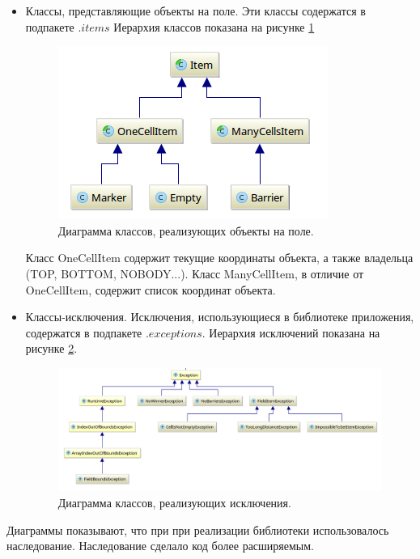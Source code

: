 \documentclass[a4paper]{article}
\begin{document}
\begin{itemize}
\item Классы, представляющие объекты на поле. Эти классы содержатся в подпакете $.items$ Иерархия классов показана на рисунке \ref{pic:classDiagram} 
\begin{figure}[H]
	\begin{center}
		\includegraphics[scale=0.5]{classDiagram}
		\caption{Диаграмма классов, реализующих объекты на поле.} 
		\label{pic:classDiagram} %
	\end{center}
\end{figure}
Класс OneCellItem содержит текущие координаты объекта, а также владельца (TOP, BOTTOM, NOBODY...). Класс ManyCellItem, в отличие от OneCellItem, содержит список координат объекта. 

\item Классы-исключения. Исключения, использующиеся в библиотеке приложения, содержатся в подпакете $.exceptions$. Иерархия исключений показана на рисунке \ref{pic:classDiagram1}.
\begin{figure}[H]
	\begin{center}
		\includegraphics[scale=0.4]{exceptions}
		\caption{Диаграмма классов, реализующих исключения.} 
		\label{pic:classDiagram1} %
	\end{center}
\end{figure}
\end{itemize}
Диаграммы показывают, что при при реализации библиотеки использовалось наследование. Наследование сделало код более расширяемым.
\end{document}
